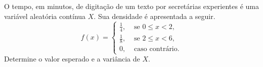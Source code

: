 %
%


\begin{exercicioBanco}[\valorquestao]
    O tempo, em minutos, de digitação de um texto por secretárias experientes é uma variável aleatória contínua \(X\). Sua densidade é apresentada a seguir.
    \[
        f(x) = \left\{
            \begin{array}{ll}
                \frac{1}{4}, & \text{ se } 0 \le x < 2, \\[5pt]
                \frac{1}{8}, & \text{ se } 2 \le x < 6, \\[5pt]
                0, & \text{ caso contrário.}
            \end{array}
        \right.
    \]
    Determine o valor esperado e a variância de \(X\).
\end{exercicioBanco}

